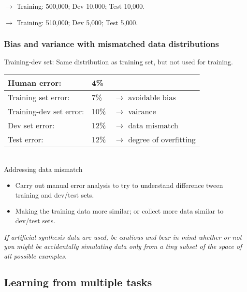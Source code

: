$\rightarrow$ Training: 500,000; Dev 10,000; Test 10,000.

$\rightarrow$ Training: 510,000; Dev 5,000; Test 5,000.\\

\subsubsection{Bias and variance with mismatched data distributions}
Training-dev set: Same distribution as training set, but not used for training.

\begin{center}
\begin{tabular}{| m{4cm} | m{3cm} | m{5cm} | }
\hline
Human error: & 4\% &\\
\hline
Training set error: &7\% & $\rightarrow$ avoidable bias \\
\hline
Training-dev set error: & 10\% & $\rightarrow$ vairance \\
\hline
Dev set error: & 12\% & $\rightarrow$ data mismatch \\
\hline
Test error: &12\% & $\rightarrow$ degree of overfitting \\
\hline
\end{tabular}
\end{center}
~\\
Addressing data mismatch
\begin{itemize}
\item
Carry out manual error analysis to try to understand difference tween training and dev/test sets.
\item
Making the training data more similar; or collect more data similar to dev/test sets.
\end{itemize}
\emph{\textcolor{Bittersweet}{If artificial synthesis data are used, be cautious and bear in mind whether or not you might be accidentally simulating data only from a tiny subset of the space of all possible examples.}}

%
\subsection{Learning from multiple tasks}
